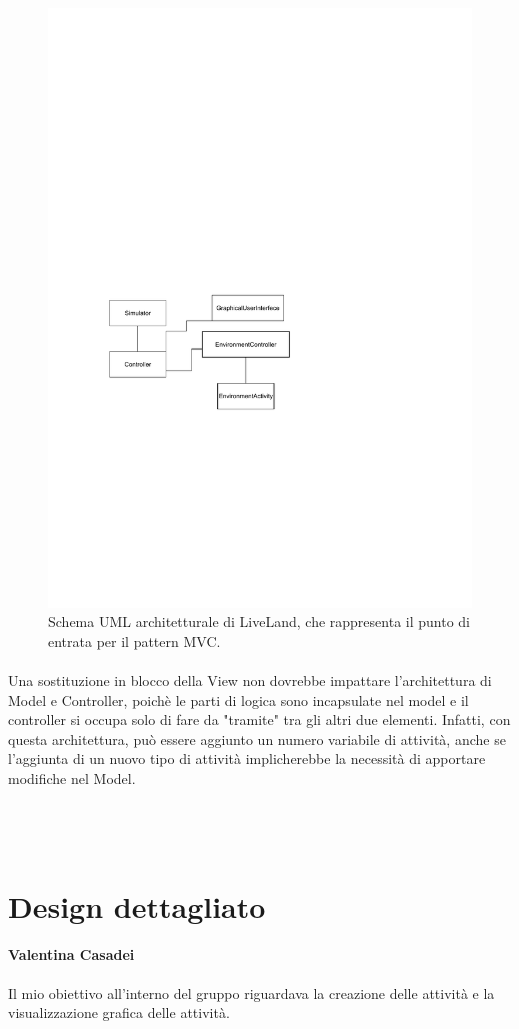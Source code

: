 \documentclass[a4paper,12pt]{report}
\begin{document}
\begin{figure}[h]
\centering{}
\includegraphics[width=.7\textwidth]{img/arch.pdf}
\caption{Schema UML architetturale di LiveLand, che rappresenta il punto di entrata per il pattern MVC.}
\label{img:arch}
\end{figure}

\paragraph{}Una sostituzione in blocco della View non dovrebbe impattare l'architettura di Model e Controller, poichè le parti di logica sono incapsulate nel model e il controller si occupa solo di fare da "tramite" tra gli altri due elementi. Infatti, con questa architettura, può essere aggiunto un numero variabile di attività, anche se l'aggiunta di un nuovo tipo di attività implicherebbe la necessità di apportare modifiche nel Model.\\\\\\\\


\onecolumn
\section{Design dettagliato}

\paragraph{Valentina Casadei}
Il mio obiettivo all’interno del gruppo riguardava la creazione delle attività e la visualizzazione grafica delle attività.
\end{document}
